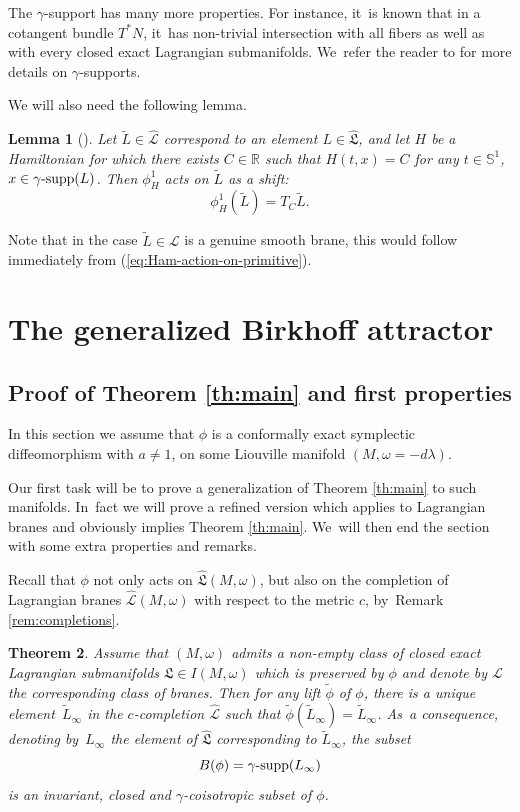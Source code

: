 \documentclass[10pt]{amsart}
\newtheorem{thm}{Theorem}[section]
\newtheorem{lem}[thm]{Lemma}
\theoremstyle{definition}
\newcommand {\LL}{{\mathcal L}}
\newcommand{\R}{\mathbb{R}}
\DeclareMathOperator{\gammasupp}{\gamma\textup{-supp}}
\newcommand{\fL}{\mathfrak {L}}
\newcommand{\hatL}{\widehat{\fL}}
\newcommand{\hatLL}{\widehat{\LL}}
\begin{document}
The $\gamma$\nobreakdash-support has many more properties. For instance, it~is known that in a cotangent bundle $T^*N$, it~has non-trivial intersection with all fibers as well as with every closed exact Lagrangian submanifolds. We~refer the reader to \cite{Viterbo-gammas} for more details on $\gamma$\nobreakdash-supports.

We will also need the following lemma.

\begin{lem}[{\cite[Lem.\,6.12]{Viterbo-gammas}}]\label{lem:shift-of brane} Let $\tilde L\in \hatLL$ correspond to an element $L\in\hatL$, and let $H$ be a Hamiltonian for which there exists $C\in\R$ such that $H(t,x)=C$ for any $t\in\mathbb{S}^1$, $x\in \gammasupp(L)$. Then $\phi_H^1$ acts on $\tilde L$ as a shift:\vspace*{-3pt}
\[
\phi_H^1(\tilde L)=T_C\tilde L.
\]
\end{lem}

Note that in the case $\tilde L\in\LL$ is a genuine smooth brane, this would follow immediately from (\ref{eq:Ham-action-on-primitive}).

\section{The generalized Birkhoff attractor}\label{Section-Birkhoff-attractor}

\subsection{Proof of Theorem \ref{th:main} and first properties}

In this section we assume that $\phi$ is a conformally exact symplectic diffeomorphism with $a\neq 1$, on some Liouville manifold $(M,\omega=-d\lambda)$.

Our first task will be to prove a generalization of Theorem \ref{th:main} to such manifolds. In~fact we will prove a refined version which applies to Lagrangian branes and obviously implies Theorem \ref{th:main}. We~will then end the section with some extra properties and remarks.

Recall that $\phi$ not only acts on $\hatL(M,\omega)$, but also on the completion of Lagrangian branes $\hatLL(M,\omega)$ with respect to the metric $c$, by~Remark \ref{rem:completions}.

\begin{thm}\label{th:main-for-branes}
Assume that $(M,\omega)$ admits a non-empty class of closed exact Lagrangian submanifolds $\fL\in I(M,\omega)$ which is preserved by $\phi$ and denote by $\LL$ the corresponding class of branes.
Then for any lift $\tilde\phi$ of $\phi$, there is a unique element~$\tilde L_\infty$ in the $c$-completion $\hatLL$
such that $\tilde\phi\left(\tilde L_\infty\right)=\tilde L_\infty$. As~a consequence, denoting by~$L_\infty$ the element of $\hatL$ corresponding to $\tilde L_\infty$,
the subset\vspace*{-3pt}
\[
B(\phi)=\gammasupp(L_\infty)
\]
is an invariant, closed and $\gamma$\nobreakdash-coisotropic subset of $\phi$.
\end{thm}
\end{document}
